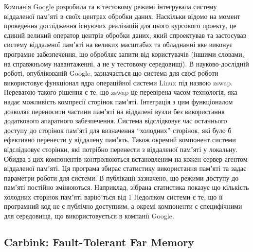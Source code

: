     Компанія Google розробила та в тестовому режимі інтегрувала систему віддаленої памʼяті в своїх центрах обробки даних. Наскільки відомо на момент проведення дослідження існуючих реалізацій для цього курсового проекту, це єдиний великий оператор центрів обробки даних, який спроектував та застосував систему віддаленої памʼяті на великих масштабах та обладнанні яке виконує програмне забезпечення, що обробляє запити від користувачів (іншими словами, на справжньому навантаженні, а не у тестовому середовищі).
	В науково-дослідній роботі, опублікованій Google, зазначається що система для своєї роботи використовує функціонал ядра операційної системи Linux під назвою zswap. Перевагою такого рішення є те, що zswap це перевірена часом технологія, яка надає можливість компресії сторінок памʼяті. Інтеграція з цим функціоналом дозволяє переносити частини памʼяті на віддалені вузли без використання додаткового апаратного забезпечення.
Система відслідковує час останнього доступу до сторінок памʼяті для визначення “холодних” сторінок, які було б ефективно перенести у віддалену памʼять. Також окремий компонент системи відслідковує сторінки, які потрібно перенести з віддаленої памʼяті у локальну. Обидва з цих компонентів контролюються встановленим на кожен сервер агентом віддаленої памʼяті. Ця програма збирає статистику використання памʼяті та задає параметри роботи для системи.
В публікації зазначено, що режими доступу до памʼяті постійно змінюються. Наприклад, зібрана статистика показує що кількість холодних сторінок памʼяті варіюʼться від 1%
Недоліком системи є те, що її програмний код не є публічно доступним, а окремі компоненти є специфічними для середовища, що використовується в компанії Google.

\subsection{Carbink: Fault-Tolerant Far Memory}

